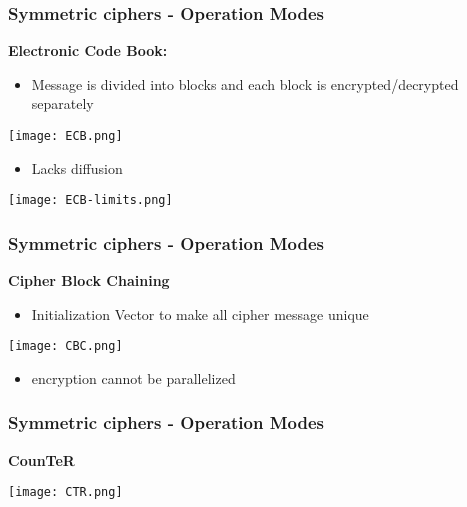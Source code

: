 \documentclass[
hyperref={pdfpagelabels=false}
,xcolor=table
]
{beamer}
\newcommand{\minus}{{\texttt{[image: minus.png]}}}
\begin{document}
\begin{frame}
  \frametitle{Symmetric ciphers - Operation Modes}
  \textbf{Electronic Code Book:}
  \begin{itemize}
  \item Message is divided into blocks and each block is encrypted/decrypted separately
  \end{itemize}

  \begin{center}
    \texttt{[image: ECB.png]}
  \end{center}

  \begin{itemize}
  \item[\minus] Lacks diffusion 
  \end{itemize}

  \begin{center}
    \texttt{[image: ECB-limits.png]}
  \end{center}
  
\end{frame}



\begin{frame}
  \frametitle{Symmetric ciphers - Operation Modes}
  \textbf{Cipher Block Chaining}
  \begin{itemize}
  \item Initialization Vector to make all cipher message unique
  \end{itemize}


  \begin{center}
    \texttt{[image: CBC.png]}
  \end{center}
  \begin{itemize}
  \item[\minus] encryption cannot be parallelized
  \end{itemize}
  
\end{frame}


\begin{frame}
  \frametitle{Symmetric ciphers - Operation Modes}
  \textbf{CounTeR}


  \begin{center}
    \texttt{[image: CTR.png]}
  \end{center}

\end{frame}
\end{document}
